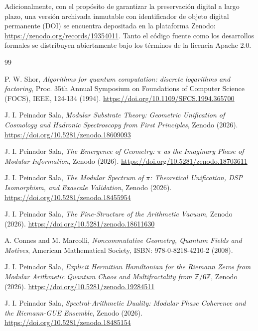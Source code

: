 \documentclass[12pt,a4paper]{article}
\theoremstyle{plain}
\theoremstyle{definition}
\theoremstyle{remark}
\begin{document}
Adicionalmente, con el propósito de garantizar la preservación digital a largo plazo, una versión archivada inmutable con identificador de objeto digital permanente (DOI) se encuentra depositada en la plataforma Zenodo: \url{https://zenodo.org/records/19354011}. Tanto el código fuente como los desarrollos formales se distribuyen abiertamente bajo los términos de la licencia Apache 2.0.

\begin{thebibliography}{99}

P. W. Shor, \textit{Algorithms for quantum computation: discrete logarithms and factoring}, Proc. 35th Annual Symposium on Foundations of Computer Science (FOCS), IEEE, 124-134 (1994). \url{https://doi.org/10.1109/SFCS.1994.365700}

J. I. Peinador Sala, \textit{Modular Substrate Theory: Geometric Unification of Cosmology and Hadronic Spectroscopy from First Principles}, Zenodo (2026). \url{https://doi.org/10.5281/zenodo.18609093}

J. I. Peinador Sala, \textit{The Emergence of Geometry: $\pi$ as the Imaginary Phase of Modular Information}, Zenodo (2026). \url{https://doi.org/10.5281/zenodo.18703611}

J. I. Peinador Sala, \textit{The Modular Spectrum of $\pi$: Theoretical Unification, DSP Isomorphism, and Exascale Validation}, Zenodo (2026). \url{https://doi.org/10.5281/zenodo.18455954}

J. I. Peinador Sala, \textit{The Fine-Structure of the Arithmetic Vacuum}, Zenodo (2026). \url{https://doi.org/10.5281/zenodo.18611630}

A. Connes and M. Marcolli, \textit{Noncommutative Geometry, Quantum Fields and Motives}, American Mathematical Society, ISBN: 978-0-8218-4210-2 (2008).

J. I. Peinador Sala, \textit{Explicit Hermitian Hamiltonian for the Riemann Zeros from Modular Arithmetic Quantum Chaos and Multifractality from $\mathbb{Z}/6\mathbb{Z}$}, Zenodo (2026). \url{https://doi.org/10.5281/zenodo.19284511}

J. I. Peinador Sala, \textit{Spectral-Arithmetic Duality: Modular Phase Coherence and the Riemann-GUE Ensemble}, Zenodo (2026). \url{https://doi.org/10.5281/zenodo.18485154}


\end{thebibliography}
\end{document}
